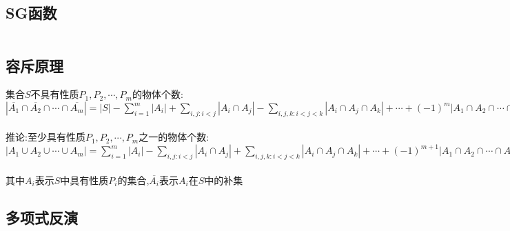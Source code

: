 \documentclass[twocolumn,a4]{article}
\begin{document}
\subsection{SG函数}
\begin{lstlisting}

\end{lstlisting}

\subsection{容斥原理}
集合$S$不具有性质$P_{1},P_{2},\cdots ,P_{m}$的物体个数:\\
$\displaystyle\left\lvert \overline{A_{1}}\cap \overline{A_{2}}\cap \cdots \cap \overline{A_{m}}  \right\rvert = \left\lvert S \right\rvert -\sum_{i=1}^{m}\left\lvert A_{i} \right\rvert+\sum_{i,j:i<j}\left\lvert A_{i}\cap A_{j} \right\rvert - \sum_{i,j,k:i<j<k}\left\lvert A_{i}\cap A_{j}\cap A_{k} \right\rvert + \cdots +(-1)^{m}\left\lvert A_{1}\cap A_{2}\cap \cdots \cap A_{m} \right\rvert$\\
\\
推论:至少具有性质$P_{1},P_{2},\cdots ,P_{m}$之一的物体个数:\\
$\displaystyle\left\lvert A_{1}\cup A_{2}\cup \cdots \cup A_{m}  \right\rvert = \sum_{i=1}^{m}\left\lvert A_{i} \right\rvert-\sum_{i,j:i<j}\left\lvert A_{i}\cap A_{j} \right\rvert + \sum_{i,j,k:i<j<k}\left\lvert A_{i}\cap A_{j}\cap A_{k} \right\rvert + \cdots +(-1)^{m+1}\left\lvert A_{1}\cap A_{2}\cap \cdots \cap A_{m} \right\rvert$\\
\\
其中$A_{i}$表示$S$中具有性质$P_{i}$的集合,$\overline{A_{i}}$表示$A_{i}$在$S$中的补集\\

\subsection{多项式反演}
\begin{lstlisting}

\end{lstlisting}
\end{document}
